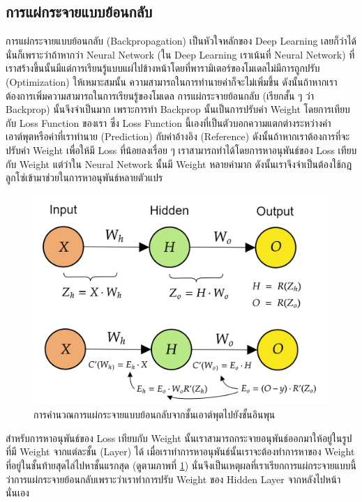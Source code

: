 \subsection{การแผ่กระจายแบบย้อนกลับ}
\label{ssec:backprop}

การแผ่กระจายแบบย้อนกลับ (Backpropagation) เป็นหัวใจหลักของ Deep Learning เลยก็ว่าได้ นั่นก็เพราะว่าถ้าหากว่า Neural Network 
(ใน Deep Learning เราเน้นที่ Neural Network) ที่เราสร้างขึ้นนั้นมีแต่การเรียนรู้แบบแผ่ไปข้างหน้าโดยที่พารามิเตอร์ของโมเดลไม่มีการถูกปรับ
(Optimization) ให้เหมาะสมนั้น ความสามารถในการทำนายค่าก็จะไม่เพิ่มขึ้น ดังนั้นถ้าหากเราต้องการเพิ่มความสามารถในการเรียนรู้ของโมเดล 
การแผ่กระจายย้อนกลับ (เรียกสั้น ๆ ว่า Backprop) นั้นจึงจำเป็นมาก เพราะการทำ Backprop นั้นเป็นการปรับค่า Weight โดยการเทียบกับ Loss
Function ของเรา ซึ่ง Loss Function นี้เองที่เป็นตัวบอกความแตกต่างระหว่างค่าเอาต์พุตหรือค่าที่เราทำนาย (Prediction) กับค่าอ้างอิง 
(Reference) ดังนั้นถ้าหากเราต้องการที่จะปรับค่า Weight เพื่อให้มี Loss ที่น้อยลงเรื่อย ๆ เราสามารถทำได้โดยการหาอนุพันธ์ของ Loss 
เทียบกับ Weight แต่ว่าใน Neural Network นั้นมี Weight หลายค่ามาก ดังนั้นเราจึงจำเป็นต้องใช้กฎลูกโซ่เข้ามาช่วยในการหาอนุพันธ์หลายตัวแปร

\begin{figure}[H]
    \centering
    \includegraphics[width=0.8\linewidth]{fig/nn_backprop.png}
    \caption{การคำนวณการแผ่กระจายแบบย้อนกลับจากชั้นเอาต์พุตไปยังชั้นอินพุน}
    \label{fig:nn_bp}
\end{figure}

สำหรับการหาอนุพันธ์ของ Loss เทียบกับ Weight นั้นเราสามารถกระจายอนุพันธ์ออกมาให้อยู่ในรูปที่มี Weight จากแต่ละชั้น (Layer) ได้ 
เมื่อเราทำการหาอนุพันธ์นั้นเราจะต้องทำการหาของ Weight ที่อยู่ในชั้นท้ายสุดไล่ไปหาชั้นแรกสุด (ดูตามภาพที่ \ref{fig:nn_bp})
นั่นจึงเป็นเหตุผลที่เราเรียกการแผ่กระจายแบบนี้ว่าการแผ่กระจายย้อนกลับเพราะว่าเราทำการปรับ Weight ของ Hidden Layer จากหลังไปหน้านั่นเอง

